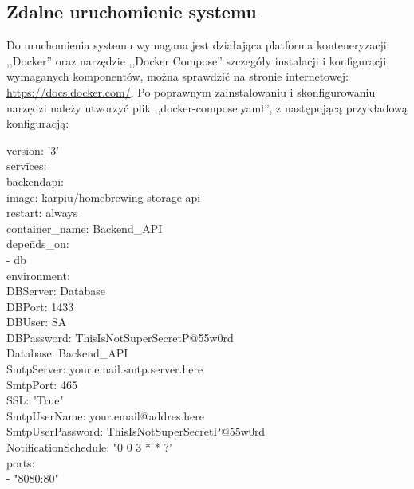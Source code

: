 \documentclass[12pt,a4paper]{article}
\begin{document}
		\subsection{Zdalne uruchomienie systemu}
			\indent Do uruchomienia systemu wymagana jest działająca platforma konteneryzacji ,,Docker''
			oraz narzędzie ,,Docker Compose'' szczegóły instalacji i konfiguracji wymaganych
			komponentów, można sprawdzić na stronie internetowej: \url{https://docs.docker.com/}.
			Po poprawnym zainstalowaniu i skonfigurowaniu narzędzi należy utworzyć plik ,,docker-compose.yaml'',
			z następującą przykładową konfiguracją:  
			\begin{tcolorbox}[minipage,colback=white,arc=0pt,outer arc=0pt, fontupper=\footnotesize]
				\begin{tabbing}
						version: '3' \\
						serv\= ices: \\
						\> back\= endapi: \\
        				\>\> image: karpiu/homebrewing-storage-api \\
        				\>\> restart: always \\
        				\>\> container\_name: Backend\_API \\
        				\>\> depe\= nds\_on: \\
            			\>\>\> - db \\ 
        				\>\> environment: \\ 
            			\>\>\> DBServer: Database \\ 
            			\>\>\> DBPort: 1433 \\ 
            			\>\>\> DBUser: SA \\
            			\>\>\> DBPassword: ThisIsNotSuperSecretP@55w0rd \\
            			\>\>\> Database: Backend\_API \\
            			\>\>\> SmtpServer: your.email.smtp.server.here \\
            			\>\>\> SmtpPort: 465 \\
						\>\>\> SSL: "True" \\
            			\>\>\> SmtpUserName: your.email@addres.here \\
            			\>\>\> SmtpUserPassword: ThisIsNotSuperSecretP@55w0rd \\
            			\>\>\> NotificationSchedule: "0 0 3 * * ?" \\
        				\>\> ports: \\
            			\>\>\> - "8080:80" \\

\end{tabbing}
\end{tcolorbox}
\end{document}
